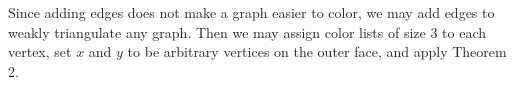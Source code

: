 \documentclass[12pt,a4paper]{article}
\begin{document}
\noindent Since adding edges does not make a graph easier to color, we may add edges to weakly triangulate
any graph. Then we may assign color lists of size $3$ to each vertex, set $x$ and $y$ to be arbitrary
vertices on the outer face, and apply Theorem 2.


\begin{comment}
\begin{proof}
Let $w\in N_C(z)$ be the closest vertex to $y$ between $z$ and $y$ along the outer face, allowing $w=y$.

We will proceed by removing one vertex from $P$ at a time. Let us set $L(v)=L(v)-\alpha$ for
each $v\in N_{G-P}(x)$. Thus for $v\in N_{G-P}$, if $v\in C$ then $|L(v)|\ge1$ and $|L(v)|\ge2$ otherwise.
Let $w$ and $z$ be the vertices immediately prior and immediately following $x$ in $C$ respectively.
By applying Theorem 2 we may remove $x$.\\

\noindent We continue the above process, recursing on all blocks produced, until all path vertices are removed.
Let $G-P=G_0,G_1,\ldots,G_k$ be the blocks produced. We then proceed through each $G_i$ from first split to last
split.\\

\noindent Suppose $y\not\in G_i$. If $G_i\cap P-x\ne\emptyset$ we color $G_i$ with Theorem 3 using the cutvertices
as $x$ and $y$, and $G_i\cap P-x\ne\emptyset$ as the path. Otherwise we color $G_i$ with Theorem 4 using
cutvertices as $x$ and $y$.\\

\noindent Suppose $y\in G_i$. By our construction of Path $P$ we know either $y$ is a cutvertex, or
one cutvertex $c$ has $|L(c)|\ge2$. In this case we color $G_i$ in the manner described above and find
$c$ has been colored some color, we will call $\omega$. Then let us color . In this way we ensure that \\

\noindent Otherewise, by Theorem 2, let $G-p=G_0,G_1,\ldots,G_k$ ordered such that $G_0$ is the block
containing $w$ and proceeding over until $G_k$ is the block containing $z$. Clearly $G_0$ and $G_k$ will
have a single cutvertex and each $G_i$, $0<i<k$, will have two. Furthermore, $c\in G_i$ is a cutvertex
if and only if we had $c\in C\cap N_G(x)$ and therefore the cutvertices, and vertices $w$ and $z$ are exactly
the vertices guaranteed
$|L(v)|\ge1$. All other vertices $v$ on the outer face of each $G_i$ will have $|L(v)|\ge2$ and remaining
interior vertices will still have $|L(v)|\ge3$.\\


\end{comment}
\end{document}
